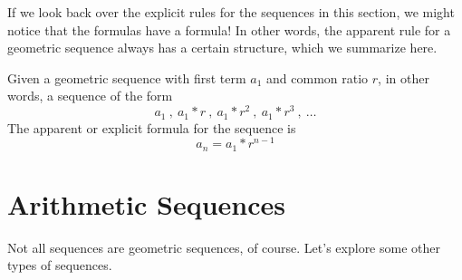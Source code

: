 If we look back over the explicit rules for the sequences in this section, we might notice that the formulas have a formula! In other words, the apparent rule for a geometric sequence always has a certain structure, which we summarize here.

\begin{boxeddef}
Given a geometric sequence with first term $a_1$ and common ratio $r$, in other words, a sequence of the form \[a_1~,~ a_1\ast r~,~ a_1\ast r^2~,~ a_1\ast r^3~,~ \dotsc\]
The apparent or explicit formula for the sequence is \[a_n = a_1\ast r^{n-1}\]
\end{boxeddef}


\section{Arithmetic Sequences}
\label{sec:arithmeticseq}

Not all sequences are geometric sequences, of course. Let's explore some other types of sequences.

\begin{boxedexplore}
\end{boxedexplore}

